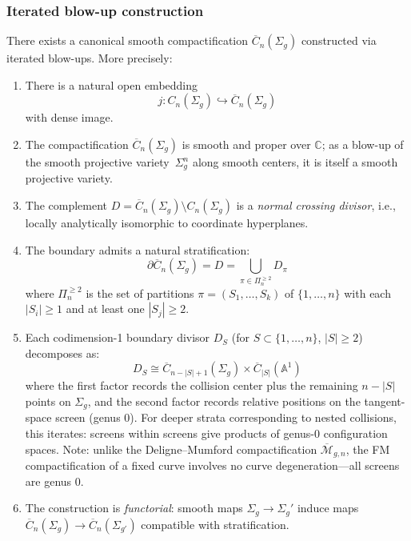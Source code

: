 \subsubsection{Iterated blow-up construction}

\begin{theorem}\label{thm:FM}
There exists a canonical smooth compactification $\overline{C}_n(\Sigma_g)$ constructed via iterated blow-ups. More precisely:

\begin{enumerate}
\item There is a natural open embedding
\[j: C_n(\Sigma_g) \hookrightarrow \overline{C}_n(\Sigma_g)\]
with dense image.

\item The compactification $\overline{C}_n(\Sigma_g)$ is smooth and proper over $\mathbb{C}$; as a blow-up of the smooth projective variety~$\Sigma_g^n$ along smooth centers, it is itself a smooth projective variety.

\item The complement $D = \overline{C}_n(\Sigma_g) \setminus C_n(\Sigma_g)$ is a \emph{normal crossing divisor}, i.e., locally analytically isomorphic to coordinate hyperplanes.

\item The boundary admits a natural stratification:
\[\partial\overline{C}_n(\Sigma_g) = D = \bigcup_{\pi \in \Pi_n^{\geq 2}} D_\pi\]
where $\Pi_n^{\geq 2}$ is the set of partitions $\pi = (S_1, \ldots, S_k)$ of $\{1,\ldots,n\}$ with each $|S_i| \geq 1$ and at least one $|S_j| \geq 2$.

\item Each codimension-1 boundary divisor $D_S$ (for $S \subset \{1,\ldots,n\}$, $|S| \geq 2$) decomposes as:
\[D_S \cong \overline{C}_{n-|S|+1}(\Sigma_g) \times \overline{C}_{|S|}(\mathbb{A}^1)\]
where the first factor records the collision center plus the remaining $n-|S|$ points on $\Sigma_g$, and the second factor records relative positions on the tangent-space screen (genus 0). For deeper strata corresponding to nested collisions, this iterates: screens within screens give products of genus-0 configuration spaces. Note: unlike the Deligne--Mumford compactification $\overline{\mathcal{M}}_{g,n}$, the FM compactification of a fixed curve involves no curve degeneration---all screens are genus 0.

\item The construction is \emph{functorial}: smooth maps $\Sigma_g \to \Sigma_g'$ induce maps $\overline{C}_n(\Sigma_g) \to \overline{C}_n(\Sigma_{g'})$ compatible with stratification.
\end{enumerate}
\end{theorem}

